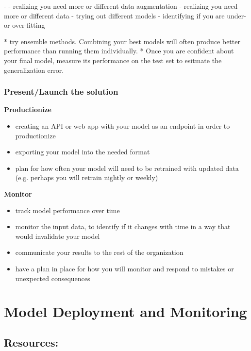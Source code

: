 \documentclass[openany]{book}
\begin{document}
  - 
  - realizing you need more or different data augmentation
  - realizing you need more or different data
  - trying out different models
  - identifying if you are under- or over-fitting

* try ensemble methods. Combining your best models will often produce better performance than running them individually. 
* Once you are confident about your final model, measure its performance on the test set to esitmate the generalization error. 


\subsection{Present/Launch the solution}

\textbf{Productionize} \\

\begin{itemize}
    \item creating an API or web app with your model as an endpoint in order to productionize
    \item exporting your model into the needed format
    \item plan for how often your model will need to be retrained with updated data (e.g. perhaps you will retrain nightly or weekly)
\end{itemize}

\textbf{Monitor} \\ 

\begin{itemize}
    \item track model performance over time
    \item monitor the input data, to identify if it changes with time in a way that would invalidate your model
    \item communicate your results to the rest of the organization
    \item have a plan in place for how you will monitor and respond to mistakes or unexpected consequences
\end{itemize}





\chapter{Model Deployment and Monitoring}



\section{Resources:}
\end{document}
